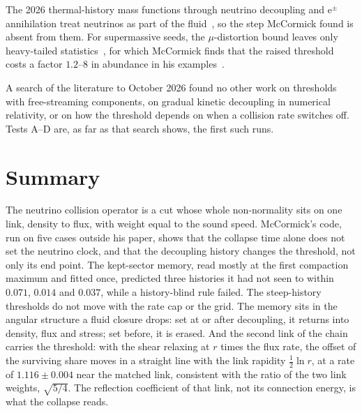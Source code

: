 \documentclass[11pt]{article}
\begin{document}
The 2026 thermal-history mass functions through neutrino decoupling and e$^\pm$ annihilation treat neutrinos as part of the fluid~\cite{Gonin}, so the step McCormick found is absent from them. For supermassive seeds, the $\mu$-distortion bound leaves only heavy-tailed statistics~\cite{Dave}, for which McCormick finds that the raised threshold costs a factor $1.2$--$8$ in abundance in his examples~\cite{McC}.

A search of the literature to October 2026 found no other work on thresholds with free-streaming components, on gradual kinetic decoupling in numerical relativity, or on how the threshold depends on when a collision rate switches off. Tests A--D are, as far as that search shows, the first such runs.

\section{Summary}

The neutrino collision operator is a cut whose whole non-normality sits on one link, density to flux, with weight equal to the sound speed. McCormick's code, run on five cases outside his paper, shows that the collapse time alone does not set the neutrino clock, and that the decoupling history changes the threshold, not only its end point. The kept-sector memory, read mostly at the first compaction maximum and fitted once, predicted three histories it had not seen to within $0.071$, $0.014$ and $0.037$, while a history-blind rule failed. The steep-history thresholds do not move with the rate cap or the grid. The memory sits in the angular structure a fluid closure drops: set at or after decoupling, it returns into density, flux and stress; set before, it is erased. And the second link of the chain carries the threshold: with the shear relaxing at $r$ times the flux rate, the offset of the surviving share moves in a straight line with the link rapidity $\tfrac12\ln r$, at a rate of $1.116\pm0.004$ near the matched link, consistent with the ratio of the two link weights, $\sqrt{5/4}$. The reflection coefficient of that link, not its connection energy, is what the collapse reads.
\end{document}
